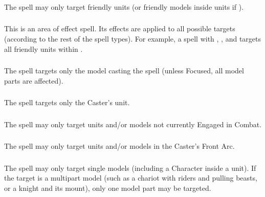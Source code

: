 \subsubsection{\augment}

The spell may only target friendly units (or friendly models inside units if \focused{}).

\subsubsection{\aura}

This is an area of effect spell. Its effects are applied to all possible targets (according to the rest of the spell types). For example, a spell with \augment{}, \aura{}, and  targets all friendly units within .

\subsubsection{\caster}

The spell targets only the model casting the spell (unless Focused, all model parts are affected).

\subsubsection{\castersunit}

The spell targets only the Caster's unit.

\subsubsection{\damage}

The spell may only target units and/or models not currently Engaged in Combat.

\subsubsection{\direct}

The spell may only target units and/or models in the Caster's Front Arc.

\subsubsection{\focused}
\label{focused}

The spell may only target single models (including a Character inside a unit). If the target is a multipart model (such as a chariot with riders and pulling beasts, or a knight and its mount), only one model part may be targeted.

